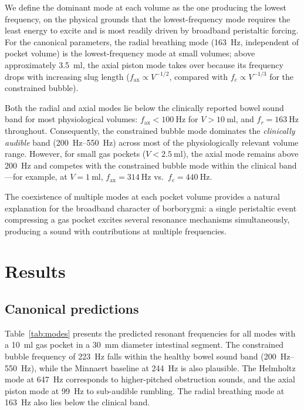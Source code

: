 \documentclass[review]{elsarticle}
\begin{document}
We define the dominant mode at each volume as the one producing the lowest
frequency, on the physical grounds that the lowest-frequency mode requires
the least energy to excite and is most readily driven by broadband peristaltic
forcing.  For the canonical parameters, the radial breathing mode
(\SI{163}{\hertz}, independent of pocket volume) is the lowest-frequency mode
at small volumes; above approximately \SI{3.5}{\milli\litre}, the axial
piston mode takes over because its frequency drops with increasing slug
length ($f_\mathrm{ax} \propto V^{-1/2}$, compared with
$f_c \propto V^{-1/3}$ for the constrained bubble).

Both the radial and axial modes lie below the clinically reported bowel sound
band for most physiological volumes: $f_\mathrm{ax} < \SI{100}{\hertz}$ for
$V > \SI{10}{\milli\litre}$, and $f_r = \SI{163}{\hertz}$ throughout.
Consequently, the constrained bubble mode dominates the \emph{clinically
audible} band (\SIrange{200}{550}{\hertz}) across most of the
physiologically relevant volume range.  However, for small gas pockets
($V < \SI{2.5}{\milli\litre}$), the axial mode remains above
\SI{200}{\hertz} and competes with the constrained bubble mode within the
clinical band---for example, at $V = \SI{1}{\milli\litre}$,
$f_\mathrm{ax} = \SI{314}{\hertz}$ vs.\ $f_c = \SI{440}{\hertz}$.

The coexistence of multiple modes at each pocket volume provides a natural
explanation for the broadband character of borborygmi: a single peristaltic
event compressing a gas pocket excites several resonance mechanisms
simultaneously, producing a sound with contributions at multiple frequencies.

\section{Results}
\label{sec:results}

\subsection{Canonical predictions}
\label{sec:canonical}

Table~\ref{tab:modes} presents the predicted resonant frequencies for all
modes with a \SI{10}{\milli\litre} gas pocket in a
\SI{30}{\milli\metre} diameter intestinal segment.  The constrained bubble
frequency of \SI{223}{\hertz} falls within the healthy bowel sound band
(\SIrange{200}{550}{\hertz}), while the Minnaert baseline at
\SI{244}{\hertz} is also plausible.  The Helmholtz mode at
\SI{647}{\hertz} corresponds to higher-pitched obstruction sounds, and the
axial piston mode at \SI{99}{\hertz} to sub-audible rumbling.  The radial
breathing mode at \SI{163}{\hertz} also lies below the clinical band.
\end{document}
